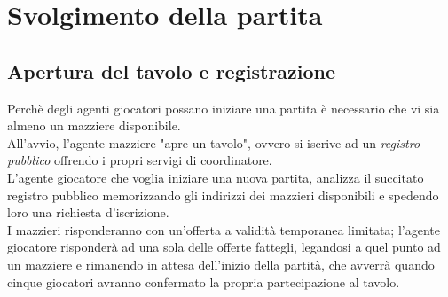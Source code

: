 \section{Svolgimento della partita}

\subsection{Apertura del tavolo e registrazione}
Perchè degli agenti giocatori possano iniziare una partita è necessario che vi sia almeno un mazziere disponibile.\\
All'avvio, l'agente mazziere "apre un tavolo", ovvero si iscrive ad un \emph{registro pubblico} offrendo i propri servigi di coordinatore.\\
L'agente giocatore che voglia iniziare una nuova partita, analizza il succitato registro pubblico memorizzando gli indirizzi dei mazzieri disponibili e spedendo loro una richiesta d'iscrizione.\\
I mazzieri risponderanno con un'offerta a validità temporanea limitata; l'agente giocatore risponderà ad una sola delle offerte fattegli, legandosi a quel punto ad un mazziere e rimanendo in attesa dell'inizio della partità, che avverrà quando cinque giocatori avranno confermato la propria partecipazione al tavolo.\\

